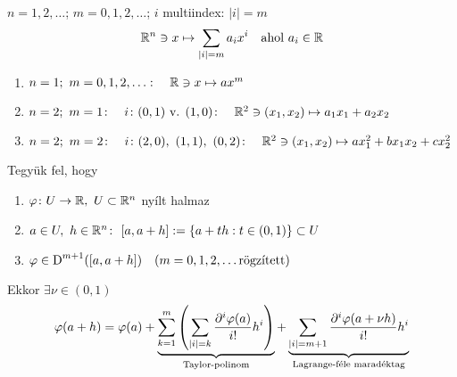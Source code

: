 \begin{de} \ \\$n=1,2,\dotsc$; $m=0,1,2,\dotsc$; $i$ multiindex: $|i|=m$
  \[\mathbb{R}^n\owns x\mapsto \sum_{|i|=m}a_ix^i\quad \text{ahol }a_i\in\mathbb{R}\]  
\end{de}

\begin{spec}{\listazjromai\begin{enumerate}
  \item $n=1;\ m=0,1,2,\dotsc\colon\quad \mathbb{R}\owns x\mapsto ax^m$
  \item $n=2;\ m=1\colon\quad i\colon (0,1) \text { v. }(1,0)\colon\quad \mathbb{R}^2\owns(x_1,x_2)\mapsto a_1x_1+a_2x_2$
  \item $n=2;\ m=2\colon\quad i\colon (2,0),\ (1,1),\ (0,2)\colon\quad \R^2\owns(x_1,x_2)\mapsto ax_1^2+bx_1x_2 +
    cx_2^2$    
  \end{enumerate} }
\end{spec}

\begin{te}Tegyük fel, hogy
  {\listazjbetu \begin{enumerate}
    \item $\vfi\colon U\n\R,\ U\subset\R^n$ nyílt halmaz
    \item $a\in U,\ h\in\mathbb{R}^n\colon\ [a,a+h] := \{a+th:t\in(0,1)\}\subset U$
    \item $\varphi\in\operatorname{D}^{m+1}([a,a+h])\quad(m=0,1,2,\dotsc\text{rögzített})$
  \end{enumerate} }
  Ekkor $\exists \nu\in(0,1)$
  \[ \displaystyle\varphi(a+h) = \varphi(a) + \underbrace{\sum_{k=1}^m\left(\sum_{|i|=k}\dfrac{\partial^i\varphi(a)}{i!}h^i\right)}
  _{\text{Taylor-polinom}} + \underbrace{\sum_{|i|=m+1}\dfrac{\partial^i\varphi(a+\nu h)}{i!}h^i}
  _{\text{Lagrange-féle maradéktag}}\]  
\end{te}

